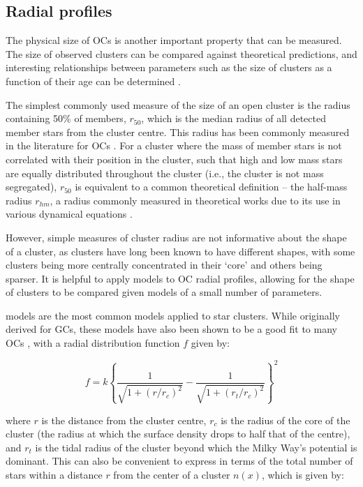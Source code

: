 \subsection{Radial profiles}
\label{sec:intro:theory:profile}

The physical size of OCs is another important property that can be measured. The size of observed clusters can be compared against theoretical predictions, and interesting relationships between parameters such as the size of clusters as a function of their age can be determined \citep{tarricq_structural_2022}.

The simplest commonly used measure of the size of an open cluster is the radius containing 50\% of members, $r_{50}$, which is the median radius of all detected member stars from the cluster centre. This radius has been commonly measured in the literature for OCs \citep[e.g.][]{cantat-gaudin_gaia_2018,cantat-gaudin_clusters_2020}. For a cluster where the mass of member stars is not correlated with their position in the cluster, such that high and low mass stars are equally distributed throughout the cluster (i.e., the cluster is not mass segregated), $r_{50}$ is equivalent to a common theoretical definition -- the half-mass radius $r_{hm}$, a radius commonly measured in theoretical works due to its use in various dynamical equations \citep{portegies_zwart_young_2010}.

However, simple measures of cluster radius are not informative about the shape of a cluster, as clusters have long been known to have different shapes, with some clusters being more centrally concentrated in their `core' and others being sparser. It is helpful to apply models to OC radial profiles, allowing for the shape of clusters to be compared given models of a small number of parameters.

\cite{king_structure_star_1962} models are the most common models applied to star clusters. While originally derived for GCs, these models have also been shown to be a good fit to many OCs \citep[e.g. in ][]{piskunov_towards_2007}, with a radial distribution function $f$ given by:

\begin{equation}
	f = k \left\{ \frac{1}{\sqrt{1 + \left(r/r_c\right)^2}} - \frac{1}{\sqrt{1 + \left(r_t/r_c\right)^2}} \right\}^2
\end{equation}

\noindent
where $r$ is the distance from the cluster centre, $r_c$ is the radius of the core of the cluster (the radius at which the surface density drops to half that of the centre), and $r_t$ is the tidal radius of the cluster beyond which the Milky Way's potential is dominant. This can also be convenient to express in terms of the total number of stars within a distance $r$ from the center of a cluster $n(x)$, which is given by:

